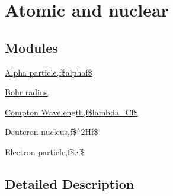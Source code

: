 \hypertarget{group___atomic}{}\section{Atomic and nuclear}
\label{group___atomic}
\subsection*{Modules}
\begin{DoxyCompactItemize}
\item 
\hyperlink{group___alpha}{Alpha particle,f\$alphaf\$}
\item 
\hyperlink{group___bohr}{Bohr radius,}
\item 
\hyperlink{group___compton}{Compton Wavelength,f\$lambda\+\_\+\+Cf\$}
\item 
\hyperlink{group___deuteron}{Deuteron nucleus,f\$$^\wedge$2\+Hf\$}
\item 
\hyperlink{group___electron}{Electron particle,f\$ef\$}
\end{DoxyCompactItemize}


\subsection{Detailed Description}
